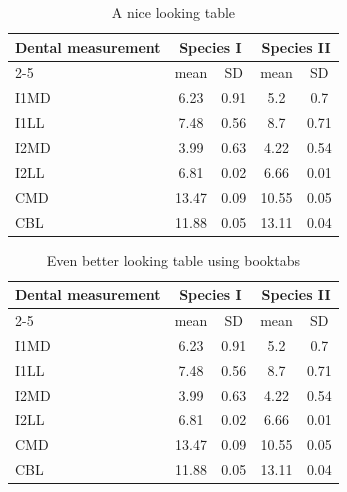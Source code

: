 \begin{table}
\caption{A nice looking table}
\centering
\label{table:nice_table}
\begin{tabular}{l c c c c}
\hline 
\multirow{2}{*}{Dental measurement} & \multicolumn{2}{c}{Species I} & \multicolumn{2}{c}{Species II} \\ 
\cline{2-5}
  & mean & SD  & mean & SD  \\ 
\hline
I1MD & 6.23 & 0.91 & 5.2  & 0.7  \\

I1LL & 7.48 & 0.56 & 8.7  & 0.71 \\

I2MD & 3.99 & 0.63 & 4.22 & 0.54 \\

I2LL & 6.81 & 0.02 & 6.66 & 0.01 \\

CMD & 13.47 & 0.09 & 10.55 & 0.05 \\

CBL & 11.88 & 0.05 & 13.11 & 0.04\\ 
\hline 
\end{tabular}
\end{table}


\begin{table}
\caption{Even better looking table using booktabs}
\centering
\label{table:good_table}
\begin{tabular}{l c c c c}
\toprule
\multirow{2}{*}{Dental measurement} & \multicolumn{2}{c}{Species I} & \multicolumn{2}{c}{Species II} \\ 
\cmidrule{2-5}
  & mean & SD  & mean & SD  \\ 
\midrule
I1MD & 6.23 & 0.91 & 5.2  & 0.7  \\

I1LL & 7.48 & 0.56 & 8.7  & 0.71 \\

I2MD & 3.99 & 0.63 & 4.22 & 0.54 \\

I2LL & 6.81 & 0.02 & 6.66 & 0.01 \\

CMD & 13.47 & 0.09 & 10.55 & 0.05 \\

CBL & 11.88 & 0.05 & 13.11 & 0.04\\ 
\bottomrule
\end{tabular}
\end{table}
